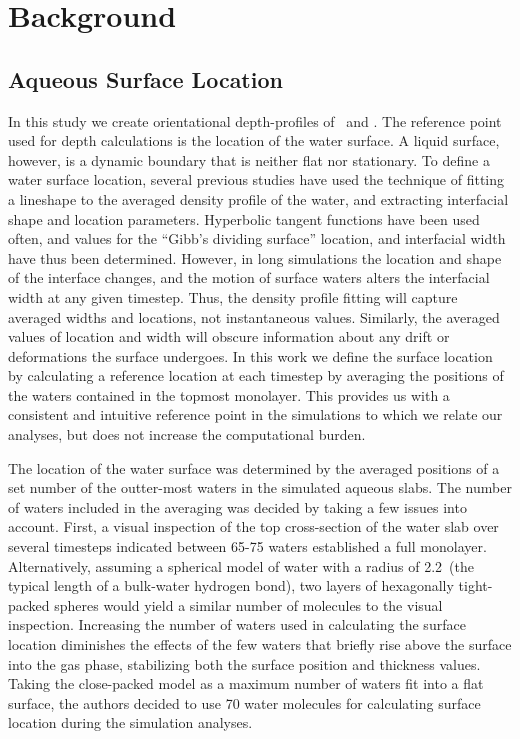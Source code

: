 \section{Background}

\subsection {Aqueous Surface Location}

	In this study we create orientational depth-profiles of \suldiox~and \wat. The reference point used for depth calculations is the location of the water surface. A liquid surface, however, is a dynamic boundary that is neither flat nor stationary. To define a water surface location, several previous studies have used the technique of fitting a lineshape to the averaged density profile of the water, and extracting interfacial shape and location parameters.\cite{Shamay2010,Wick2006c,Chowdhary2006} Hyperbolic tangent functions have been used often, and values for the ``Gibb's dividing surface'' location, and interfacial width have thus been determined.\cite{Matsumoto1988} However, in long simulations the location and shape of the interface changes, and the motion of surface waters alters the interfacial width at any given timestep. Thus, the density profile fitting will capture averaged widths and locations, not instantaneous values. Similarly, the averaged values of location and width will obscure information about any drift or deformations the surface undergoes. In this work we define the surface location by calculating a reference location at each timestep by averaging the positions of the waters contained in the topmost monolayer. This provides us with a consistent and intuitive reference point in the simulations to which we relate our analyses, but does not increase the computational burden.

  The location of the water surface was determined by the averaged positions of a set number of the outter-most waters in the simulated aqueous slabs. The number of waters included in the averaging was decided by taking a few issues into account. First, a visual inspection of the top cross-section of the water slab over several timesteps indicated between 65-75 waters established a full monolayer. Alternatively, assuming a spherical model of water with a radius of 2.2\angs~(the typical length of a bulk-water hydrogen bond), two layers of hexagonally tight-packed spheres would yield a similar number of molecules to the visual inspection. Increasing the number of waters used in calculating the surface location diminishes the effects of the few waters that briefly rise above the surface into the gas phase, stabilizing both the surface position and thickness values. Taking the close-packed model as a maximum number of waters fit into a flat surface, the authors decided to use 70 water molecules for calculating surface location during the simulation analyses.
  
